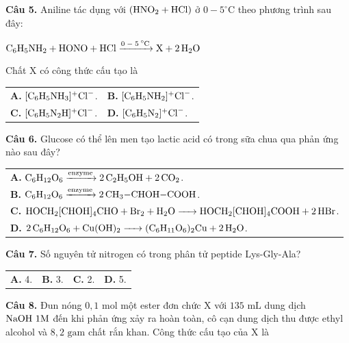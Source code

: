 \documentclass{article}
\begin{document}
\vspace*{\fill}

\textbf{Câu 5.} Aniline tác dụng với $(\ce{HNO2} + \ce{HCl})$ ở $0 - 5^\circ\text{C}$ theo phương trình sau đây:
\vspace{4pt}
\begin{center}
$\ce{C6H5NH2 + HONO + HCl ->[0 - 5^\circ\text{C}] X + 2H2O}$
\end{center}
\vspace{4pt}
Chất X có công thức cấu tạo là
\vspace{6pt}

\begin{tabularx}{\linewidth}{@{}X X@{}}
\textbf{A.} $[\ce{C6H5NH3}]^+\ce{Cl}^-$. & \textbf{B.} $[\ce{C6H5NH2}]^+\ce{Cl}^-$.\\[6pt]
\textbf{C.} $[\ce{C6H5N2H}]^+\ce{Cl}^-$. & \textbf{D.} $[\ce{C6H5N2}]^+\ce{Cl}^-$.
\end{tabularx}
\vspace*{\fill}
\newpage

\fontsize{27}{36}\selectfont
\textbf{Câu 6.} Glucose có thể lên men tạo lactic acid có trong sữa chua qua phản ứng nào sau đây?
\vspace{6pt}

\begin{tabularx}{\linewidth}{@{}X@{}}
\textbf{A.} $\ce{C6H12O6 ->[\text{enzyme}] 2C2H5OH + 2CO2}$.\\[5pt]
\textbf{B.} $\ce{C6H12O6 ->[\text{enzyme}] 2CH3-CHOH-COOH}$.\\[5pt]
\textbf{C.} $\ce{HOCH2[CHOH]4CHO + Br2 + H2O -> HOCH2[CHOH]4COOH + 2HBr}$.\\[5pt]
\textbf{D.} $\ce{2C6H12O6 + Cu(OH)2 -> (C6H11O6)2Cu + 2H2O}$.
\end{tabularx}

\vspace*{\fill}

\textbf{Câu 7.} Số nguyên tử nitrogen có trong phân tử peptide Lys-Gly-Ala?
\vspace{8pt}

\begin{tabularx}{\linewidth}{@{}X X X X@{}}
\textbf{A.} 4. & \textbf{B.} 3. & \textbf{C.} 2. & \textbf{D.} 5.
\end{tabularx}
\vspace*{\fill}
\newpage

\fontsize{28}{37}\selectfont
\textbf{Câu 8.} Đun nóng $0{,}1\text{ mol}$ một ester đơn chức X với $135\text{ mL}$ dung dịch $\ce{NaOH}\ 1\text{M}$ đến khi phản ứng xảy ra hoàn toàn, cô cạn dung dịch thu được ethyl alcohol và $8{,}2\text{ gam}$ chất rắn khan. Công thức cấu tạo của X là
\vspace{8pt}
\end{document}
